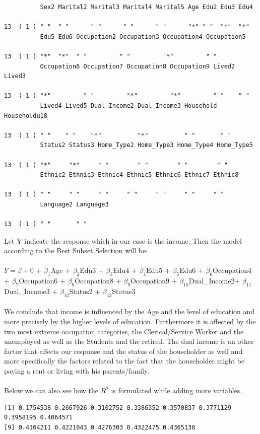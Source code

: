 \documentclass{article}
\begin{document}
{\small
\begin{verbatim}
          Sex2 Marital2 Marital3 Marital4 Marital5 Age Edu2 Edu3 Edu4

13  ( 1 ) " "  " "      " "      " "      " "      "*" " "  "*"  "*" 
          Edu5 Edu6 Occupation2 Occupation3 Occupation4 Occupation5
      
13  ( 1 ) "*"  "*"  " "         " "         "*"         " "        
          Occupation6 Occupation7 Occupation8 Occupation9 Lived2 Lived3

13  ( 1 ) "*"         " "         "*"         "*"         " "    " "   
          Lived4 Lived5 Dual_Income2 Dual_Income3 Household Householdu18
      
13  ( 1 ) " "    " "    "*"          "*"          " "       " "         
          Status2 Status3 Home_Type2 Home_Type3 Home_Type4 Home_Type5
   
13  ( 1 ) "*"     "*"     " "        " "        " "        " "       
          Ethnic2 Ethnic3 Ethnic4 Ethnic5 Ethnic6 Ethnic7 Ethnic8
 
13  ( 1 ) " "     " "     " "     " "     " "     " "     " "    
          Language2 Language3
    
13  ( 1 ) " "       " " 
\end{verbatim}
}
\noindent Let Y indicate the response which in our case is the income. Then the model according to the Best Subset Selection will be:
\\\\
$Y= \beta+0$ + $\beta_1$Age + $\beta_2$Edu3 + $\beta_3$Edu4 + $\beta_4$Edu5 + $\beta_5$Edu6 + $\beta_6$Occupation4 + $\beta_7$Occupation6 + $\beta_8$Occupation8 + $\beta_9$Occupation9 + $\beta_10$Dual\_Income2+ $\beta_11$Dual\_Income3 + $\beta_12$Status2 + $\beta_13$Status3
\\\\
We conclude that income is influenced by the Age and the level of education and more precisely by the higher levels of education. Furthermore it is affected by the two most extreme occupation categories, the Clerical/Service Worker and the unemployed as well as the Students and the retired. The dual income is an other factor that affects our response and the status of the householder as well and more specifically the factors related to the fact that the householder might be paying a rent or living with his parents/family. 
\\\\
Below we can also see how the $R^2$ is formulated while adding more variables.
{\small
\begin{verbatim}
[1] 0.1754538 0.2667926 0.3102752 0.3386352 0.3570837 0.3771129 0.3958195 0.4064571
[9] 0.4164211 0.4221043 0.4276303 0.4322475 0.4365138
 \end{verbatim}
 }
\end{document}
